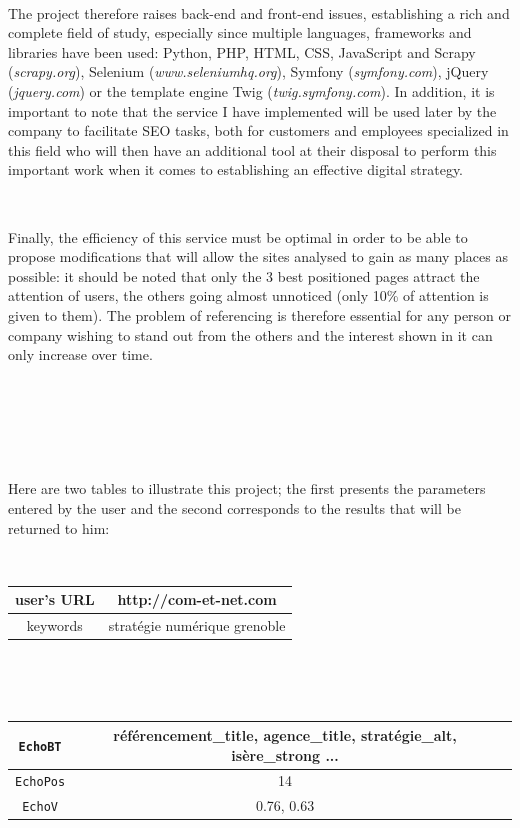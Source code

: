 \documentclass[12pt]{article}
\begin{document}
\

The project therefore raises back-end and front-end issues, establishing a rich and complete field of study, especially since multiple languages, frameworks and libraries have been used: \textsf{Python}, \textsf{PHP}, \textsf{HTML}, \textsf{CSS}, \textsf{JavaScript} and \textsf{Scrapy} (\textit{scrapy.org}), \textsf{Selenium} (\textit{www.seleniumhq.org}), \textsf{Symfony} (\textit{symfony.com}), \textsf{jQuery} (\textit{jquery.com}) or the template engine \textsf{Twig} (\textit{twig.symfony.com}). In addition, it is important to note that the service I have implemented will be used later by the company to facilitate SEO tasks, both for customers and employees specialized in this field who will then have an additional tool at their disposal to perform this important work when it comes to establishing an effective digital strategy. 

\

Finally, the efficiency of this service must be optimal in order to be able to propose modifications that will allow the sites analysed to gain as many places as possible: it should be noted that only the 3 best positioned pages attract the attention of users, the others going almost unnoticed (only 10\% of attention is given to them). The problem of referencing is therefore essential for any person or company wishing to stand out from the others and the interest shown in it can only increase over time.

\

\

\

Here are two tables to illustrate this project; the first presents the parameters entered by the user and the second corresponds to the results that will be returned to him:

\

\begin{center}
\begin{tabular}{|c|c|}
\hline
user's URL & http://com-et-net.com \\
\hline
keywords & stratégie numérique grenoble \\
\hline
\end{tabular}

\

\

\begin{tabular}{|c|c|c|}
\hline
\texttt{EchoBT} & référencement\_title, agence\_title, stratégie\_alt, isère\_strong ... \\
\hline
\texttt{EchoPos} & 14 \\
\hline
\texttt{EchoV} & 0.76, 0.63 \\
\hline
\end{tabular}
\end{center}
\end{document}
